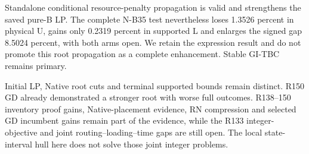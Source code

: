 Standalone conditional resource-penalty propagation is valid and strengthens the saved pure-B LP. The complete N-B35 test nevertheless loses 1.3526 percent in physical U, gains only 0.2319 percent in supported L and enlarges the signed gap 8.5024 percent, with both arms open. We retain the expression result and do not promote this root propagation as a complete enhancement. Stable GI-TBC remains primary.

Initial LP, Native root cuts and terminal supported bounds remain distinct. R150 GD already demonstrated a stronger root with worse full outcomes. R138--150 inventory proof gains, Native-placement evidence, RN compression and selected GD incumbent gains remain part of the evidence, while the R133 integer-objective and joint routing--loading--time gaps are still open. The local state-interval hull here does not solve those joint integer problems.
